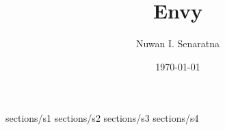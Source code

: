 \documentclass[AEJ]{AEA}
\title{Envy}
\author{Nuwan I. Senaratna}
\date{\today}
\begin{document}
\maketitle

 {sections/s1}
 {sections/s2}
 {sections/s3}
 {sections/s4}


\end{document}
